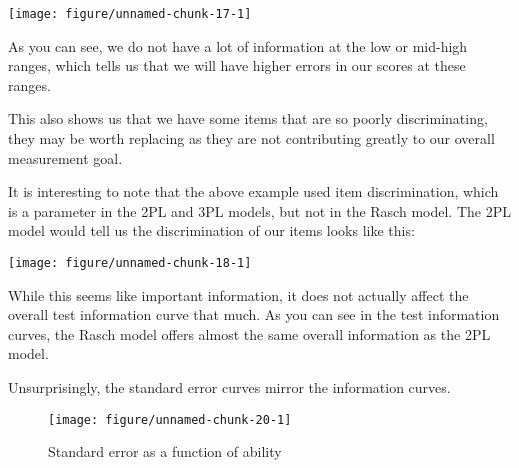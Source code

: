 \documentclass{article}\usepackage[]{graphicx}\usepackage[]{color}
\makeatletter
\newenvironment{kframe}{%
 \def\at@end@of@kframe{}%
 \ifinner\ifhmode%
  \def\at@end@of@kframe{\end{minipage}}%
  \begin{minipage}{\columnwidth}%
 \fi\fi%
 \def\FrameCommand##1{\hskip\@totalleftmargin \hskip-\fboxsep
 \colorbox{shadecolor}{##1}\hskip-\fboxsep
     \hskip-\linewidth \hskip-\@totalleftmargin \hskip\columnwidth}%
 \MakeFramed {\advance\hsize-\width
   \@totalleftmargin\z@ \linewidth\hsize
   \@setminipage}}%
 {\par\unskip\endMakeFramed%
 \at@end@of@kframe}
\newenvironment{knitrout}{}{} %
\makeatother
\begin{document}
\begin{enumerate}
\begin{knitrout}
{\centering \texttt{[image: figure/unnamed-chunk-17-1]} 

}



\end{knitrout}
\raggedright
As you can see, we do not have a lot of information at the low or mid-high ranges, which tells us that we will have higher errors in our scores at these ranges.
\raggedright

This also shows us that we have some items that are so poorly discriminating, they may be worth replacing as they are not contributing greatly to our overall measurement goal.
\raggedright

It is interesting to note that the above example used item discrimination, which is a parameter in the 2PL and 3PL models, but not in the Rasch model. The 2PL model would tell us the discrimination of our items looks like this:

\centering
\begin{knitrout}
\color{fgcolor}\begin{kframe}


{\ttfamily\noindent\itshape\color{messagecolor}{\#\# EM cycles terminated after 500 iterations.}}\end{kframe}

{\centering \texttt{[image: figure/unnamed-chunk-18-1]} 

}



\end{knitrout}
\raggedright
While this seems like important information, it does not actually affect the overall test information curve that much. As you can see in the test information curves, the Rasch model offers almost the same overall information as the 2PL model.

\centering

\raggedright
Unsurprisingly, the standard error curves mirror the information curves.

\centering
\begin{knitrout}
\color{fgcolor}\begin{figure}[H]

{\centering \texttt{[image: figure/unnamed-chunk-20-1]} 

}

\caption[Standard error as a function of ability]{Standard error as a function of ability}\label{fig:unnamed-chunk-201}
\end{figure}


\end{knitrout}
\end{enumerate}
\end{document}
